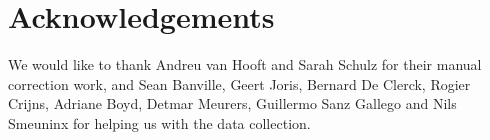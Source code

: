\section{Acknowledgements}

We would like to thank Andreu van Hooft and Sarah Schulz for their manual
correction work, and Sean Banville, Geert Joris, Bernard De Clerck, Rogier
Crijns, Adriane Boyd, Detmar Meurers, Guillermo Sanz Gallego and Nils Smeuninx
for helping us with the data collection.

